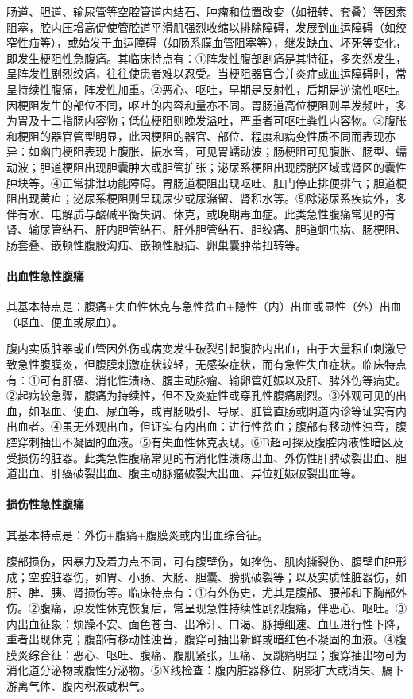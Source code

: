 肠道、胆道、输尿管等空腔管道内结石、肿瘤和位置改变（如扭转、套叠）等因素阻塞，腔内压增高促使管腔道平滑肌强烈收缩以排除障碍，发展到血运障碍（如绞窄性疝等），或始发于血运障碍（如肠系膜血管阻塞等），继发缺血、坏死等变化，即发生梗阻性急腹痛。其临床特点有：①阵发性腹部剧痛是其特征，多突然发生，呈阵发性剧烈绞痛，往往使患者难以忍受。当梗阻器官合并炎症或血运障碍时，常呈持续性腹痛，阵发性加重。②恶心、呕吐，早期是反射性，后期是逆流性呕吐。因梗阻发生的部位不同，呕吐的内容和量亦不同。胃肠道高位梗阻则早发频吐，多为胃及十二指肠内容物；低位梗阻则晚发溢吐，严重者可呕吐粪性内容物。③腹胀和梗阻的器官管型明显，此因梗阻的器官、部位、程度和病变性质不同而表现亦异：如幽门梗阻表现上腹胀、振水音，可见胃蠕动波；肠梗阻可见腹胀、肠型、蠕动波；胆道梗阻出现胆囊肿大或胆管扩张；泌尿系梗阻出现膀胱区域或肾区的囊性肿块等。④正常排泄功能障碍。胃肠道梗阻出现呕吐、肛门停止排便排气；胆道梗阻出现黄疸；泌尿系梗阻则呈现尿少或尿潴留、肾积水等。⑤除泌尿系疾病外，多伴有水、电解质与酸碱平衡失调、休克，或晚期毒血症。此类急性腹痛常见的有肾、输尿管结石、肝内胆管结石、肝外胆管结石、胆绞痛、胆道蛔虫病、肠梗阻、肠套叠、嵌顿性腹股沟疝、嵌顿性股疝、卵巢囊肿蒂扭转等。

\paragraph{出血性急性腹痛}

其基本特点是：腹痛+失血性休克与急性贫血+隐性（内）出血或显性（外）出血（呕血、便血或尿血）。

腹内实质脏器或血管因外伤或病变发生破裂引起腹腔内出血，由于大量积血刺激导致急性腹膜炎，但腹膜刺激症状较轻，无感染症状，而有急性失血症状。临床特点有：①可有肝癌、消化性溃疡、腹主动脉瘤、输卵管妊娠以及肝、脾外伤等病史。②起病较急骤，腹痛为持续性，但不及炎症性或穿孔性腹痛剧烈。③外观可见的出血，如呕血、便血、尿血等，或胃肠吸引、导尿、肛管直肠或阴道内诊等证实有内出血者。④虽无外观出血，但证实有内出血：进行性贫血；腹部有移动性浊音，腹腔穿刺抽出不凝固的血液。⑤有失血性休克表现。⑥B超可探及腹腔内液性暗区及受损伤的脏器。此类急性腹痛常见的有消化性溃疡出血、外伤性肝脾破裂出血、胆道出血、肝癌破裂出血、腹主动脉瘤破裂大出血、异位妊娠破裂出血等。

\paragraph{损伤性急性腹痛}

其基本特点是：外伤+腹痛+腹膜炎或内出血综合征。

腹部损伤，因暴力及着力点不同，可有腹壁伤，如挫伤、肌肉撕裂伤、腹壁血肿形成；空腔脏器伤，如胃、小肠、大肠、胆囊、膀胱破裂等；以及实质性脏器伤，如肝、脾、胰、肾损伤等。临床特点有：①有外伤史，尤其是腹部、腰部和下胸部外伤。②腹痛，原发性休克恢复后，常呈现急性持续性剧烈腹痛，伴恶心、呕吐。③内出血征象：烦躁不安、面色苍白、出冷汗、口渴、脉搏细速、血压进行性下降，重者出现休克；腹部有移动性浊音，腹穿可抽出新鲜或暗红色不凝固的血液。④腹膜炎综合征：恶心、呕吐、腹痛、腹肌紧张，压痛、反跳痛明显；腹穿抽出物可为消化道分泌物或腹性分泌物。⑤X线检查：腹内脏器移位、阴影扩大或消失、膈下游离气体、腹内积液或积气。


